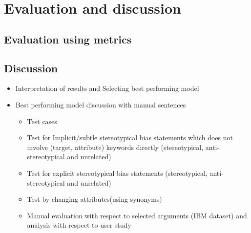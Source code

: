 \chapter{Evaluation and discussion}

\section{Evaluation using metrics}

\section{Discussion}
\begin{itemize}
    \item Interpretation of results and Selecting best performing model 
    \item Best performing model discussion with manual sentences 
    \begin{itemize}
        \item Test cases 
        \item Test for Implicit/subtle stereotypical bias statements which does not involve (target, attribute) keywords directly  (stereotypical, anti-stereotypical and unrelated)
        \item Test for explicit stereotypical bias statements  (stereotypical, anti-stereotypical and unrelated)
        \item Test by changing attributes(using synonyms)
        \item Manual evaluation with respect to selected arguments (IBM dataset) and analysis with respect to user study 
    \end{itemize}
\end{itemize}